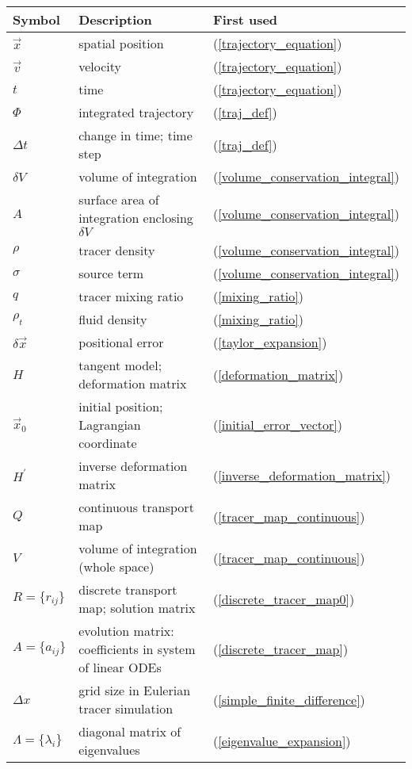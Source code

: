 

\begin{tabular}{lll}
	Symbol & Description & First used \\ \hline
	$\vec x$ & spatial position & (\ref{trajectory_equation})\\
	$\vec v$ & velocity & (\ref{trajectory_equation})\\
	$t$ & time & (\ref{trajectory_equation})\\
	$\Phi$ & integrated trajectory & (\ref{traj_def}) \\
	$\Delta t$ & change in time; time step & (\ref{traj_def}) \\
	$\delta V$ & volume of integration & (\ref{volume_conservation_integral})\\
	$A$ & surface area of integration enclosing $\delta V$ & (\ref{volume_conservation_integral})\\
	$\rho$ & tracer density & (\ref{volume_conservation_integral})\\
	$\sigma$ & source term & (\ref{volume_conservation_integral})\\
	$q$ & tracer mixing ratio & (\ref{mixing_ratio})\\
	$\rho_t$ & fluid density & (\ref{mixing_ratio})\\
	$\delta \vec x$ & positional error & (\ref{taylor_expansion})\\
	$H$ & tangent model; deformation matrix & (\ref{deformation_matrix})\\
	$\vec x_0$ & initial position; Lagrangian coordinate & (\ref{initial_error_vector})\\
	$H^\prime$ & inverse deformation matrix & (\ref{inverse_deformation_matrix})\\
	$Q$ & continuous transport map & (\ref{tracer_map_continuous}) \\
	$V$ & volume of integration (whole space) & (\ref{tracer_map_continuous}) \\
	$R=\lbrace r_{ij} \rbrace$ & discrete transport map; solution matrix & (\ref{discrete_tracer_map0}) \\
	$A=\lbrace a_{ij} \rbrace$ & evolution matrix: coefficients in system of linear ODEs & (\ref{discrete_tracer_map}) \\
	$\Delta x$ & grid size in Eulerian tracer simulation & (\ref{simple_finite_difference}) \\
	$\Lambda = \lbrace \lambda_i \rbrace$ & diagonal matrix of eigenvalues & (\ref{eigenvalue_expansion}) \\

\end{tabular}
